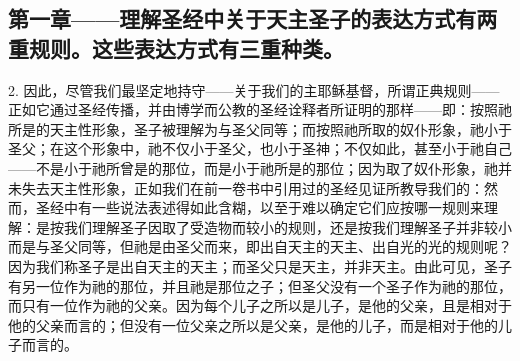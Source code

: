 
\subsection{第一章——理解圣经中关于天主圣子的表达方式有两重规则。这些表达方式有三重种类。}

2. 因此，尽管我们最坚定地持守——关于我们的主耶稣基督，所谓正典规则——正如它通过圣经传播，并由博学而公教的圣经诠释者所证明的那样——即：按照祂所是的天主性形象，圣子被理解为与圣父同等；而按照祂所取的奴仆形象，祂小于圣父；在这个形象中，祂不仅小于圣父，也小于圣神；不仅如此，甚至小于祂自己——不是小于祂所曾是的那位，而是小于祂所是的那位；因为取了奴仆形象，祂并未失去天主性形象，正如我们在前一卷书中引用过的圣经见证所教导我们的：然而，圣经中有一些说法表述得如此含糊，以至于难以确定它们应按哪一规则来理解：是按我们理解圣子因取了受造物而较小的规则，还是按我们理解圣子并非较小而是与圣父同等，但祂是由圣父而来，即出自天主的天主、出自光的光的规则呢？因为我们称圣子是出自天主的天主；而圣父只是天主，并非天主。由此可见，圣子有另一位作为祂的那位，并且祂是那位之子；但圣父没有一个圣子作为祂的那位，而只有一位作为祂的父亲。因为每个儿子之所以是儿子，是他的父亲，且是相对于他的父亲而言的；但没有一位父亲之所以是父亲，是他的儿子，而是相对于他的儿子而言的。\par

